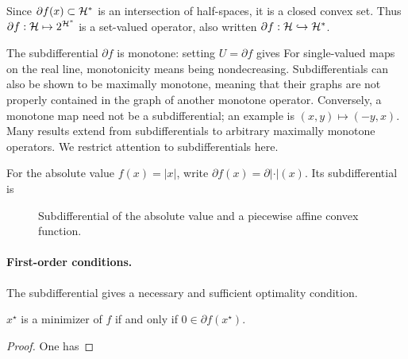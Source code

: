 Since $\partial f(x) \subset \mathcal{H}^*$ is an intersection of half-spaces, it is a closed convex set.
%
Thus $\partial f : \mathcal{H} \mapsto 2^{\mathcal{H}^*}$ is a set-valued operator, also written $\partial f : \mathcal{H} \hookrightarrow \mathcal{H}^*$.

\begin{rem}
The subdifferential $\partial f$ is monotone: setting $U=\partial f$ gives
For single-valued maps on the real line, monotonicity means being nondecreasing.
%
Subdifferentials can also be shown to be maximally monotone, meaning that their graphs are not properly contained in the graph of another monotone operator.
%
Conversely, a monotone map need not be a subdifferential; an example is $(x,y) \mapsto (-y,x)$.
% 
Many results extend from subdifferentials to arbitrary maximally monotone operators. We restrict attention to subdifferentials here.
\end{rem}

For the absolute value $f(x)=|x|$, write $\partial f(x) = \partial |\cdot|(x)$. Its subdifferential is

\begin{figure}[tbp]
\centering
{}
\caption{Subdifferential of the absolute value and a piecewise affine convex function.}
\label{fig-subdiff-l1}
\end{figure}







\paragraph{First-order conditions.}

The subdifferential gives a necessary and sufficient optimality condition.

\begin{prop}
	$x^\star$ is a minimizer of $f$ if and only if $0 \in \partial f(x^\star)$.
\end{prop}
\begin{proof}
	One has
\end{proof}

